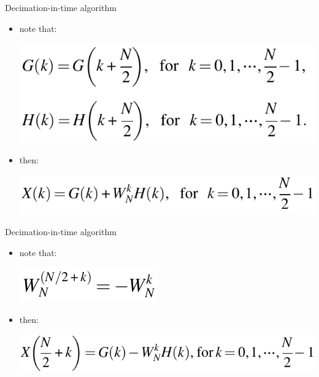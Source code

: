 \documentclass[pdflatex,compress,mathserif]{beamer}
\begin{document}
\begin{frame}{Decimation-in-time algorithm}
	\begin{itemize}
		\item note that:
		\begin{center}
			\includegraphics[width=0.6\linewidth]{img/img24}
		\end{center}
		\item then:
		\begin{center}
		\includegraphics[width=0.8\linewidth]{img/img25}
		\end{center}
	\end{itemize}
\end{frame}

\begin{frame}{Decimation-in-time algorithm}
	\begin{itemize}
		\item note that:
		\begin{center}
			\includegraphics[width=0.3\linewidth]{img/img26}
		\end{center}
		\item then:
		\begin{center}
			\includegraphics[width=0.8\linewidth]{img/img27}
		\end{center}
	\end{itemize}
\end{frame}
\end{document}
